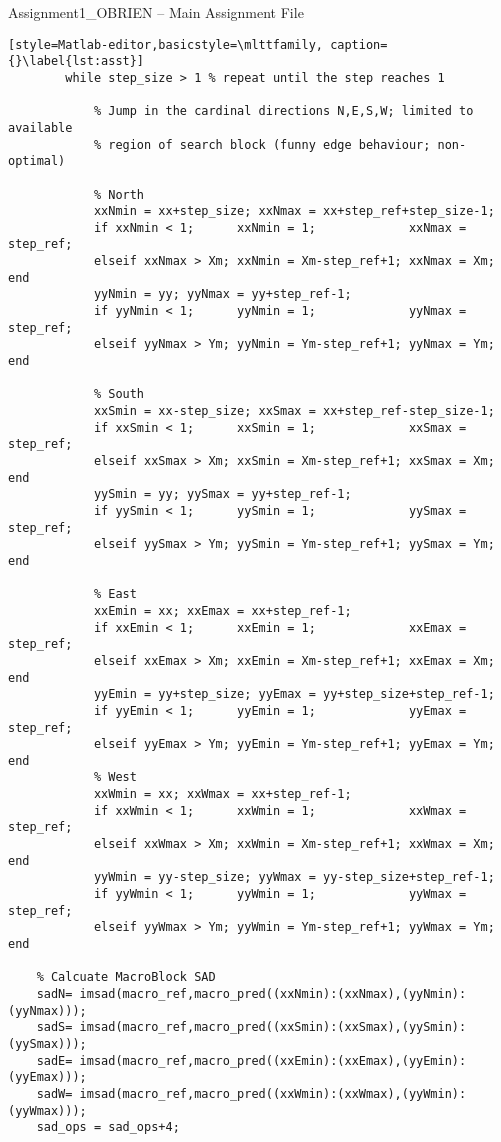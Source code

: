 \begin{codeblock}{Assignment1\_OBRIEN -- Main Assignment File}
\begin{lstlisting}[style=Matlab-editor,basicstyle=\mlttfamily, caption={}\label{lst:asst}]
        while step_size > 1 % repeat until the step reaches 1
                
            % Jump in the cardinal directions N,E,S,W; limited to available
            % region of search block (funny edge behaviour; non-optimal)

            % North
            xxNmin = xx+step_size; xxNmax = xx+step_ref+step_size-1;
            if xxNmin < 1;      xxNmin = 1;             xxNmax = step_ref;
            elseif xxNmax > Xm; xxNmin = Xm-step_ref+1; xxNmax = Xm; end
            yyNmin = yy; yyNmax = yy+step_ref-1;
            if yyNmin < 1;      yyNmin = 1;             yyNmax = step_ref;
            elseif yyNmax > Ym; yyNmin = Ym-step_ref+1; yyNmax = Ym; end

            % South
            xxSmin = xx-step_size; xxSmax = xx+step_ref-step_size-1;
            if xxSmin < 1;      xxSmin = 1;             xxSmax = step_ref;
            elseif xxSmax > Xm; xxSmin = Xm-step_ref+1; xxSmax = Xm; end 
            yySmin = yy; yySmax = yy+step_ref-1;
            if yySmin < 1;      yySmin = 1;             yySmax = step_ref;
            elseif yySmax > Ym; yySmin = Ym-step_ref+1; yySmax = Ym; end

            % East
            xxEmin = xx; xxEmax = xx+step_ref-1;
            if xxEmin < 1;      xxEmin = 1;             xxEmax = step_ref;
            elseif xxEmax > Xm; xxEmin = Xm-step_ref+1; xxEmax = Xm; end
            yyEmin = yy+step_size; yyEmax = yy+step_size+step_ref-1;
            if yyEmin < 1;      yyEmin = 1;             yyEmax = step_ref;
            elseif yyEmax > Ym; yyEmin = Ym-step_ref+1; yyEmax = Ym; end
            % West
            xxWmin = xx; xxWmax = xx+step_ref-1;
            if xxWmin < 1;      xxWmin = 1;             xxWmax = step_ref;
            elseif xxWmax > Xm; xxWmin = Xm-step_ref+1; xxWmax = Xm; end
            yyWmin = yy-step_size; yyWmax = yy-step_size+step_ref-1;
            if yyWmin < 1;      yyWmin = 1;             yyWmax = step_ref;
            elseif yyWmax > Ym; yyWmin = Ym-step_ref+1; yyWmax = Ym; end

    % Calcuate MacroBlock SAD
    sadN= imsad(macro_ref,macro_pred((xxNmin):(xxNmax),(yyNmin):(yyNmax)));
    sadS= imsad(macro_ref,macro_pred((xxSmin):(xxSmax),(yySmin):(yySmax)));
    sadE= imsad(macro_ref,macro_pred((xxEmin):(xxEmax),(yyEmin):(yyEmax)));
    sadW= imsad(macro_ref,macro_pred((xxWmin):(xxWmax),(yyWmin):(yyWmax)));
    sad_ops = sad_ops+4;


\end{lstlisting}
\end{codeblock}
